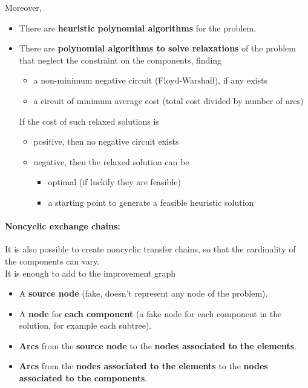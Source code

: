 Moreover,
\begin{itemize}
	\item There are \textbf{heuristic polynomial algorithms} for the problem.\\
	
	\item There are \textbf{polynomial algorithms to solve relaxations} of the problem that neglect the constraint on the components, finding
	\begin{itemize}
		\item a non-minimum negative circuit (Floyd-Warshall), if any exists
		
		\item a circuit of minimum average cost (total cost divided by number of arcs)
	\end{itemize}
	If the cost of such relaxed solutions is
	\begin{itemize}
		\item positive, then no negative circuit exists
		
		\item negative, then the relaxed solution can be
		\begin{itemize}
			\item optimal (if luckily they are feasible)
			\item a starting point to generate a feasible heuristic solution
		\end{itemize}
	\end{itemize}
\end{itemize}

\newpage

\paragraph{Noncyclic exchange chains:} It is also possible to create noncyclic transfer chains, so that the cardinality of the components can vary.\\

It is enough to add to the improvement graph
\begin{itemize}
	\item A \textbf{source node} (fake, doesn't represent any node of the problem).\\
	
	\item A \textbf{node} for \textbf{each component} (a fake node for each component in the solution, for example each subtree).\\
	
	\item \textbf{Arcs} from the \textbf{source node} to the \textbf{nodes associated to the elements}.\\
	
	\item \textbf{Arcs} from the \textbf{nodes associated to the elements} to the \textbf{nodes associated to the components}.\\
\end{itemize}

